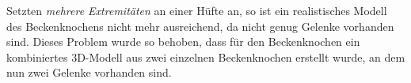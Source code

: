 Setzten \emph{mehrere Extremitäten} an einer Hüfte an, so ist ein realistisches Modell des Beckenknochens nicht mehr ausreichend, da nicht genug Gelenke vorhanden sind. Dieses Problem wurde so behoben, dass für den Beckenknochen ein kombiniertes 3D-Modell aus zwei einzelnen Beckenknochen erstellt wurde, an dem nun zwei Gelenke vorhanden sind.




